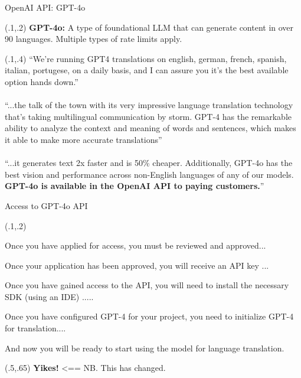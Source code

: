 \documentclass{beamer}
\begin{document}
\begin{frame}{OpenAI API: GPT-4o}

\begin{textblock}{1}(.1,.2)
  \small {\textbf{GPT-4o:} A type of foundational LLM that can generate content in over 90 languages. Multiple types of rate limits apply. }
\end{textblock}


\begin{textblock}{1}(.1,.4)
  \footnotesize {\enquote{We're running GPT4 translations on english, german, french, spanish, italian, portugese, on a daily basis, and I can assure you it's the best available option hands down.}\\~\\
  \enquote{...the talk of the town with its very impressive language translation technology that's taking multilingual communication by storm. GPT-4 has the remarkable ability to analyze the context and meaning of words and sentences, which makes it able to make more accurate translations}\\~\\
  \enquote{...it generates text 2x faster and is 50\% cheaper. Additionally, GPT-4o has the best vision and performance across non-English languages of any of our models. \textbf{GPT-4o is available in the OpenAI API to paying customers.}}
}
\end{textblock}

\end{frame}


\begin{frame}{Access to GPT-4o API}

\begin{textblock}{1}(.1,.2)
  \footnotesize {Once you have applied for access, you must be reviewed and approved...

Once your application has been approved, you will receive an API key ...

Once you have gained access to the API, you will need to install the necessary SDK (using an IDE) ..... 

Once you have configured GPT-4 for your project, you need to initialize GPT-4 for translation....

And now you will be ready to start using the model for language translation.}
\end{textblock}

\begin{textblock}{1}(.5,.65)
  \normalsize{\textbf{Yikes!} <== NB. This has changed.}
\end{textblock}

\end{frame}
\end{document}
